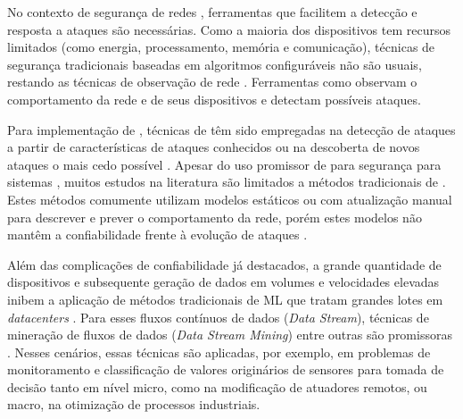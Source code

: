 No contexto de segurança de redes \iot, ferramentas que facilitem a detecção e
resposta a ataques são necessárias.
Como a maioria dos dispositivos \iot tem recursos limitados (como energia,
processamento, memória e comunicação), técnicas de segurança tradicionais
baseadas em algoritmos configuráveis não são usuais, restando as
técnicas de observação de rede \cite{Zhou2017}.
Ferramentas como \nids observam o comportamento da rede e de seus dispositivos
e detectam possíveis ataques.
% 

Para implementação de \nids, técnicas de \ml têm sido empregadas na detecção de
ataques a partir de características de ataques conhecidos ou na
descoberta de novos ataques o mais cedo possível
\cite{buczak2016survey,mitchell2014survey}.
Apesar do uso promissor de \ml para segurança para sistemas \iot, muitos estudos
na literatura \cite{buczak2016survey,mitchell2014survey,Tahsien2020} são
limitados a métodos tradicionais de \ml.
Estes métodos comumente utilizam modelos estáticos ou com atualização manual
para descrever e prever o comportamento da rede, porém estes modelos não mantêm
a confiabilidade frente à evolução de ataques
\cite{Viegas2019,Lopez2019}.



Além das complicações de confiabilidade já destacados, a grande quantidade de
dispositivos e subsequente geração de dados em volumes e velocidades elevadas
inibem a aplicação de métodos tradicionais de ML que tratam grandes lotes em
\emph{datacenters} \cite{Lopez2019}.
Para esses fluxos contínuos de dados (\emph{Data Stream}), técnicas de
mineração de fluxos de dados (\emph{Data Stream Mining}) entre outras são
promissoras \cite{Faria2016ndds,Akbar2017,Lopez2019,AriyaluranHabeeb2019}.
% 
Nesses cenários, essas técnicas são aplicadas, por exemplo, em problemas de
monitoramento e classificação de valores originários de sensores para tomada de
decisão tanto em nível micro, como na modificação de atuadores remotos, ou
macro, na otimização de processos industriais.
% 

